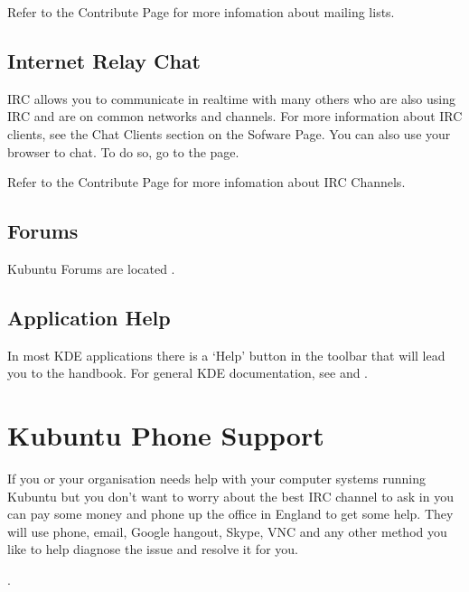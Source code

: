 \documentclass[letterpaper,10pt,english]{sphinxmanual}
\begin{document}
\sphinxAtStartPar
Refer to the Contribute Page for more infomation about mailing lists.


\subsection{Internet Relay Chat}
\label{\detokenize{docs/support:internet-relay-chat}}
\sphinxAtStartPar
IRC allows you to communicate in real\sphinxhyphen{}time with many others who are also using IRC and are on common networks and channels. For more information about IRC clients, see the Chat Clients section on the Sofware Page. You can also use your browser to chat. To do so, go to the  page.

\sphinxAtStartPar
Refer to the Contribute Page for more infomation about IRC Channels.


\subsection{Forums}
\label{\detokenize{docs/support:forums}}
\sphinxAtStartPar
Kubuntu Forums are located .


\subsection{Application Help}
\label{\detokenize{docs/support:application-help}}
\sphinxAtStartPar
In most KDE applications there is a ‘Help’ button in the toolbar that will lead you to the handbook. For general KDE documentation, see  and .


\section{Kubuntu Phone Support}
\label{\detokenize{docs/support:kubuntu-phone-support}}
\sphinxAtStartPar
If you or your organisation needs help with your computer systems running Kubuntu but you don’t want to worry about the best IRC channel to ask in you can pay some money and phone up the office in England to get some help. They will use phone, e\sphinxhyphen{}mail, Google hangout, Skype, VNC and any other method you like to help diagnose the issue and resolve it for you.

\sphinxAtStartPar
{}.
\end{document}
